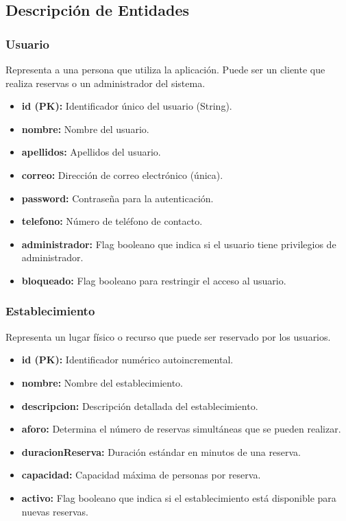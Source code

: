 \subsection{Descripción de Entidades}

\subsubsection{Usuario}
Representa a una persona que utiliza la aplicación. Puede ser un cliente que realiza reservas o un administrador del sistema.
\begin{itemize}
    \item \textbf{id (PK):} Identificador único del usuario (String).
    \item \textbf{nombre:} Nombre del usuario.
    \item \textbf{apellidos:} Apellidos del usuario.
    \item \textbf{correo:} Dirección de correo electrónico (única).
    \item \textbf{password:} Contraseña para la autenticación.
    \item \textbf{telefono:} Número de teléfono de contacto.
    \item \textbf{administrador:} Flag booleano que indica si el usuario tiene privilegios de administrador.
    \item \textbf{bloqueado:} Flag booleano para restringir el acceso al usuario.
\end{itemize}

\subsubsection{Establecimiento}
Representa un lugar físico o recurso que puede ser reservado por los usuarios.
\begin{itemize}
    \item \textbf{id (PK):} Identificador numérico autoincremental.
    \item \textbf{nombre:} Nombre del establecimiento.
    \item \textbf{descripcion:} Descripción detallada del establecimiento.
    \item \textbf{aforo:} Determina el número de reservas simultáneas que se pueden realizar.
    \item \textbf{duracionReserva:} Duración estándar en minutos de una reserva.
    \item \textbf{capacidad:} Capacidad máxima de personas por reserva.
    \item \textbf{activo:} Flag booleano que indica si el establecimiento está disponible para nuevas reservas.
\end{itemize}


